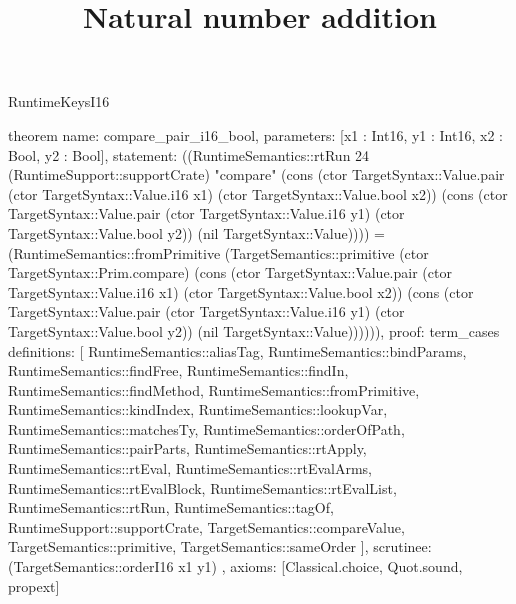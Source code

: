 \begin{lexlean}{RuntimeKeysI16}
\title{Natural number addition}
\begin{semanticmodule}
theorem{
  name: compare_pair_i16_bool,
  parameters: [x1 : Int16, y1 : Int16, x2 : Bool, y2 : Bool],
  statement: ((RuntimeSemantics::rtRun 24 (RuntimeSupport::supportCrate) "compare" (cons (ctor TargetSyntax::Value.pair (ctor TargetSyntax::Value.i16 x1) (ctor TargetSyntax::Value.bool x2)) (cons (ctor TargetSyntax::Value.pair (ctor TargetSyntax::Value.i16 y1) (ctor TargetSyntax::Value.bool y2)) (nil TargetSyntax::Value)))) = (RuntimeSemantics::fromPrimitive (TargetSemantics::primitive (ctor TargetSyntax::Prim.compare) (cons (ctor TargetSyntax::Value.pair (ctor TargetSyntax::Value.i16 x1) (ctor TargetSyntax::Value.bool x2)) (cons (ctor TargetSyntax::Value.pair (ctor TargetSyntax::Value.i16 y1) (ctor TargetSyntax::Value.bool y2)) (nil TargetSyntax::Value)))))),
  proof: term_cases{
    definitions: [
      RuntimeSemantics::aliasTag,
      RuntimeSemantics::bindParams,
      RuntimeSemantics::findFree,
      RuntimeSemantics::findIn,
      RuntimeSemantics::findMethod,
      RuntimeSemantics::fromPrimitive,
      RuntimeSemantics::kindIndex,
      RuntimeSemantics::lookupVar,
      RuntimeSemantics::matchesTy,
      RuntimeSemantics::orderOfPath,
      RuntimeSemantics::pairParts,
      RuntimeSemantics::rtApply,
      RuntimeSemantics::rtEval,
      RuntimeSemantics::rtEvalArms,
      RuntimeSemantics::rtEvalBlock,
      RuntimeSemantics::rtEvalList,
      RuntimeSemantics::rtRun,
      RuntimeSemantics::tagOf,
      RuntimeSupport::supportCrate,
      TargetSemantics::compareValue,
      TargetSemantics::primitive,
      TargetSemantics::sameOrder
    ],
    scrutinee: (TargetSemantics::orderI16 x1 y1)
  },
  axioms: [Classical.choice, Quot.sound, propext]
}


\end{semanticmodule}
\end{lexlean}
